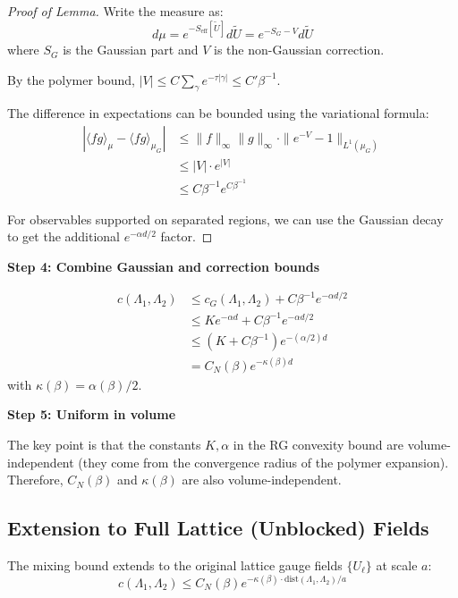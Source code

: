 \begin{proof}[Proof of Lemma]
Write the measure as:
\begin{equation}
d\mu = e^{-S_{\text{eff}}[\widetilde{U}]} d\widetilde{U} = e^{-S_G - V} d\widetilde{U}
\end{equation}
where $S_G$ is the Gaussian part and $V$ is the non-Gaussian correction.

By the polymer bound, $|V| \le C \sum_{\gamma} e^{-\tau |\gamma|} \le C' \beta^{-1}$.

The difference in expectations can be bounded using the variational formula:
\begin{align}
|\langle fg \rangle_\mu - \langle fg \rangle_{\mu_G}| &\le \|f\|_\infty \|g\|_\infty \cdot \|e^{-V} - 1\|_{L^1(\mu_G)} \\
&\le |V| \cdot e^{|V|} \\
&\le C \beta^{-1} e^{C \beta^{-1}}
\end{align}

For observables supported on separated regions, we can use the Gaussian decay to get the additional $e^{-\alpha d/2}$ factor.
\end{proof}

\textbf{Step 4: Combine Gaussian and correction bounds}

\begin{align}
c(\Lambda_1, \Lambda_2) &\le c_G(\Lambda_1, \Lambda_2) + C \beta^{-1} e^{-\alpha d/2} \\
&\le K e^{-\alpha d} + C \beta^{-1} e^{-\alpha d/2} \\
&\le (K + C\beta^{-1}) e^{-(\alpha/2) d} \\
&= C_N(\beta) e^{-\kappa(\beta) d}
\end{align}
with $\kappa(\beta) = \alpha(\beta)/2$.

\textbf{Step 5: Uniform in volume}

The key point is that the constants $K, \alpha$ in the RG convexity bound are volume-independent (they come from the convergence radius of the polymer expansion). Therefore, $C_N(\beta)$ and $\kappa(\beta)$ are also volume-independent.

\subsection{Extension to Full Lattice (Unblocked) Fields}

\begin{corollary}
\label{cor:mixing-original-fields}
The mixing bound extends to the original lattice gauge fields $\{U_\ell\}$ at scale $a$:
\begin{equation}
c(\Lambda_1, \Lambda_2) \le C_N(\beta) e^{-\kappa(\beta) \cdot \text{dist}(\Lambda_1, \Lambda_2) / a}
\end{equation}
\end{corollary}

